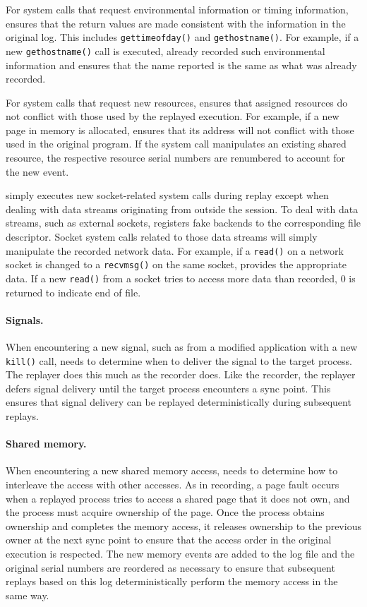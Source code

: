 For system calls that request environmental information or timing
information, {\dora} ensures that the return values are made
consistent with the information in the original log.  This includes
{\tt gettimeofday()} and {\tt gethostname()}.  For example, if a new
{\tt gethostname()} call is executed, {\dora} already recorded such
environmental information and ensures that the name reported is 
the same as what was already recorded.

For system calls that request new resources, {\dora} ensures that 
assigned resources do not conflict with those used by the replayed
execution.  For example, if a new page in memory is allocated,
{\dora} ensures that its address will not conflict with those used
in the original program.  If the system call manipulates an existing
shared resource, the respective resource serial numbers are renumbered
to account for the new event. 

{\dora} simply executes new socket-related system calls during replay
except when dealing with data streams originating from outside the
session.  To deal with data streams, such as
external sockets, {\dora} registers fake backends to the
corresponding file descriptor.
Socket system calls related to those data streams will simply
manipulate the recorded network data.  For example, if a {\tt read()}
on a network socket is changed to a {\tt recvmsg()} on the same
socket, {\dora} provides the appropriate
data. If a new {\tt read()} from a socket tries to access
more data than recorded, $0$ is returned to indicate end of file. 

\paragraph{Signals.}
When encountering a new signal, such as from a modified application
with a new {\tt kill()} call, {\dora} needs to determine when to
deliver the signal to the target process.
The replayer does this much as the recorder does.
Like the recorder, the replayer
defers signal delivery until the target process encounters a sync point. This
ensures that signal delivery can be replayed deterministically during subsequent
replays.

\paragraph{Shared memory.}
When encountering a new shared memory access, {\dora} needs to
determine how to interleave the access with other accesses.
As in recording,
a page fault occurs
when a replayed
process tries to access a shared page that it does not own,
and the process must acquire
ownership of the page.  Once the process obtains ownership and
completes the memory access, it releases ownership to the previous owner at the
next sync point to ensure that the access order in the original execution is
respected.  The new memory events are added to the log file and the
original serial numbers are reordered as necessary to ensure that
subsequent replays based on this log deterministically perform the
memory access in the same way.

